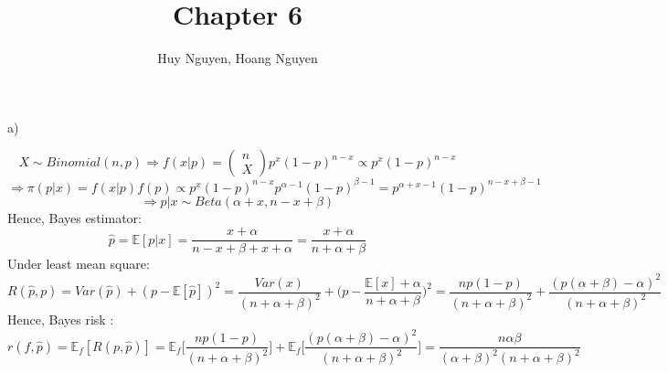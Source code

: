 \documentclass[10pt]{article}
\newenvironment{problem}[2][Problem]{\begin{trivlist}
\item[\hskip \labelsep {\bfseries #1}\hskip \labelsep {\bfseries #2.}]}{\end{trivlist}}
\begin{document}
\title{Chapter 6}
\author{Huy Nguyen, Hoang Nguyen}
\maketitle
    
\begin{problem}{1}

a) 

\[X \sim Binomial(n, p) \Rightarrow f(x|p)= \begin{pmatrix}
n\\
X
\end{pmatrix} p^x (1-p)^{n-x} \propto p^x(1-p)^{n-x} \] 
\[\Rightarrow \pi (p|x)= f(x|p)f(p) \propto p^x(1-p)^{n-x}p^{\alpha -1}(1-p)^{\beta -1} =p^{\alpha + x -1}(1-p)^{n-x+\beta -1}\]
\[\Rightarrow p|x \sim Beta(\alpha+x, n-x+\beta)\]
Hence, Bayes estimator:
\[\hat{p}= \mathbb{E}[p|x]= \frac{x+\alpha}{n-x+\beta + x+ \alpha}= \frac{x+\alpha}{n+\alpha +\beta}\]
Under least mean square:
\[R(\hat{p}, p)= Var(\hat{p})+ (p-\mathbb{E}[\hat{p}])^2=\frac{Var(x)}{(n+\alpha + \beta)^2}+ \big( p-\frac{\mathbb{E}[x]+\alpha}{n+ \alpha + \beta}\big)^2= \frac{np(1-p)}{(n+ \alpha + \beta)^2} + \frac{(p(\alpha + \beta)-\alpha)^2}{(n+ \alpha + \beta)^2}\]
Hence, Bayes risk :
\[r(f, \hat{p})= \mathbb{E}_f [R(p, \hat{p})]= \mathbb{E}_f \big [ \frac{np(1-p)}{(n+ \alpha + \beta)^2} \big] + \mathbb{E}_f \big [ \frac{(p(\alpha + \beta)-\alpha)^2}{(n+ \alpha + \beta)^2} \big ]=\frac{n\alpha \beta}{(\alpha + \beta)^2 (n+ \alpha + \beta)^2}\]




\end{problem}
\end{document}
